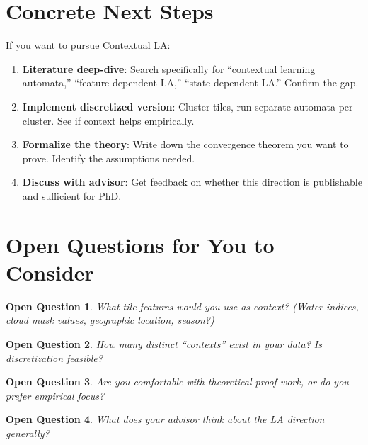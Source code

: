 \documentclass[11pt]{article}
\newtheorem{question}{Open Question}
\begin{document}
\section{Concrete Next Steps}

If you want to pursue Contextual LA:

\begin{enumerate}
  \item \textbf{Literature deep-dive}: Search specifically for ``contextual learning automata,'' ``feature-dependent LA,'' ``state-dependent LA.'' Confirm the gap.

  \item \textbf{Implement discretized version}: Cluster tiles, run separate automata per cluster. See if context helps empirically.

  \item \textbf{Formalize the theory}: Write down the convergence theorem you want to prove. Identify the assumptions needed.

  \item \textbf{Discuss with advisor}: Get feedback on whether this direction is publishable and sufficient for PhD.
\end{enumerate}

\section{Open Questions for You to Consider}

\begin{question}
What tile features would you use as context? (Water indices, cloud mask values, geographic location, season?)
\end{question}

\begin{question}
How many distinct ``contexts'' exist in your data? Is discretization feasible?
\end{question}

\begin{question}
Are you comfortable with theoretical proof work, or do you prefer empirical focus?
\end{question}

\begin{question}
What does your advisor think about the LA direction generally?
\end{question}
\end{document}
